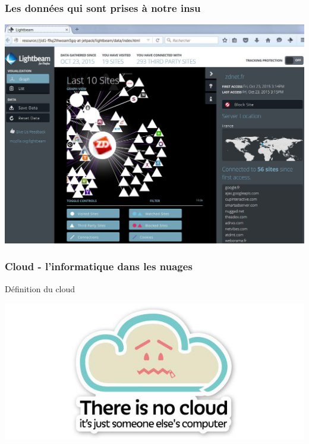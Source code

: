 \documentclass{beamer}
\begin{document}
\begin{frame}
\frametitle{Les données qui sont prises à notre insu}

\includegraphics[scale=0.45] {./images/Lightbeam.jpg} 

\end{frame}

\begin{frame}
\frametitle{Cloud - l'informatique dans les nuages}
\begin{block}{Définition du cloud}
\begin{center}
\includegraphics[scale=0.5] {./images/cloud.png} 
\end{center}
\end{block}
\end{frame}
\end{document}
